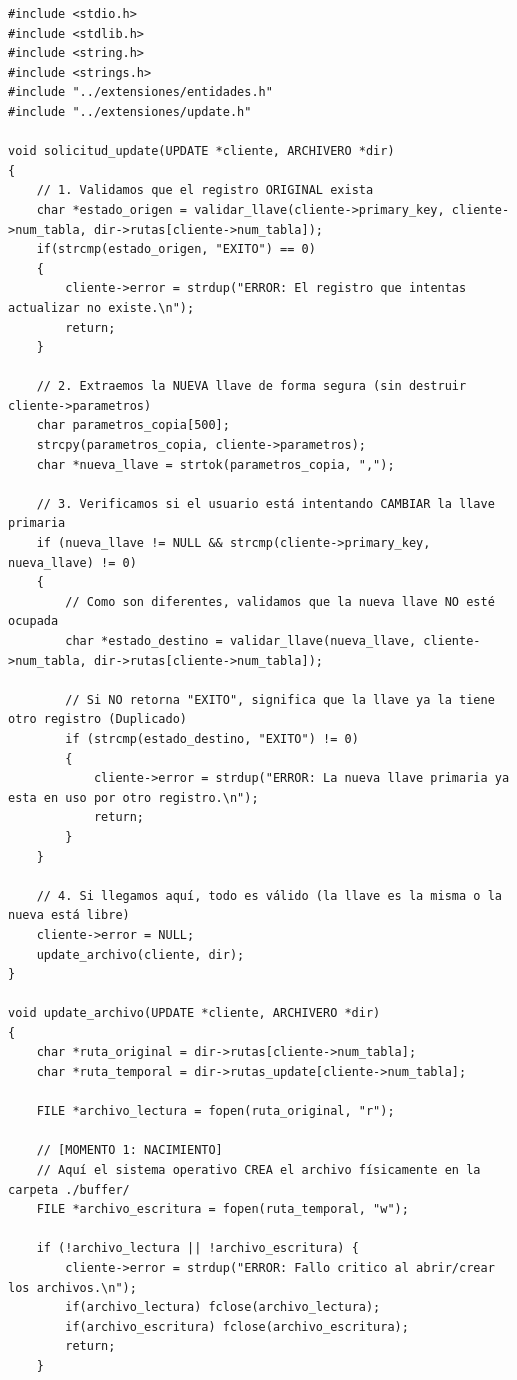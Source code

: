 \documentclass[12pt]{article}
\begin{document}
\begin{lstlisting}[style=estiloC ,title={Código 4. Servidor TCP (update.c)}]
#include <stdio.h>
#include <stdlib.h>
#include <string.h>
#include <strings.h>
#include "../extensiones/entidades.h"
#include "../extensiones/update.h"

void solicitud_update(UPDATE *cliente, ARCHIVERO *dir)
{
    // 1. Validamos que el registro ORIGINAL exista
    char *estado_origen = validar_llave(cliente->primary_key, cliente->num_tabla, dir->rutas[cliente->num_tabla]);
    if(strcmp(estado_origen, "EXITO") == 0) 
    {
        cliente->error = strdup("ERROR: El registro que intentas actualizar no existe.\n");
        return;
    }

    // 2. Extraemos la NUEVA llave de forma segura (sin destruir cliente->parametros)
    char parametros_copia[500];
    strcpy(parametros_copia, cliente->parametros);
    char *nueva_llave = strtok(parametros_copia, ",");

    // 3. Verificamos si el usuario está intentando CAMBIAR la llave primaria
    if (nueva_llave != NULL && strcmp(cliente->primary_key, nueva_llave) != 0)
    {
        // Como son diferentes, validamos que la nueva llave NO esté ocupada
        char *estado_destino = validar_llave(nueva_llave, cliente->num_tabla, dir->rutas[cliente->num_tabla]);
        
        // Si NO retorna "EXITO", significa que la llave ya la tiene otro registro (Duplicado)
        if (strcmp(estado_destino, "EXITO") != 0) 
        {
            cliente->error = strdup("ERROR: La nueva llave primaria ya esta en uso por otro registro.\n");
            return;
        }
    }

    // 4. Si llegamos aquí, todo es válido (la llave es la misma o la nueva está libre)
    cliente->error = NULL;
    update_archivo(cliente, dir);
}

void update_archivo(UPDATE *cliente, ARCHIVERO *dir)
{
    char *ruta_original = dir->rutas[cliente->num_tabla];
    char *ruta_temporal = dir->rutas_update[cliente->num_tabla]; 

    FILE *archivo_lectura = fopen(ruta_original, "r");
    
    // [MOMENTO 1: NACIMIENTO] 
    // Aquí el sistema operativo CREA el archivo físicamente en la carpeta ./buffer/
    FILE *archivo_escritura = fopen(ruta_temporal, "w"); 

    if (!archivo_lectura || !archivo_escritura) {
        cliente->error = strdup("ERROR: Fallo critico al abrir/crear los archivos.\n");
        if(archivo_lectura) fclose(archivo_lectura);
        if(archivo_escritura) fclose(archivo_escritura);
        return;
    }


\end{lstlisting}
\end{document}
